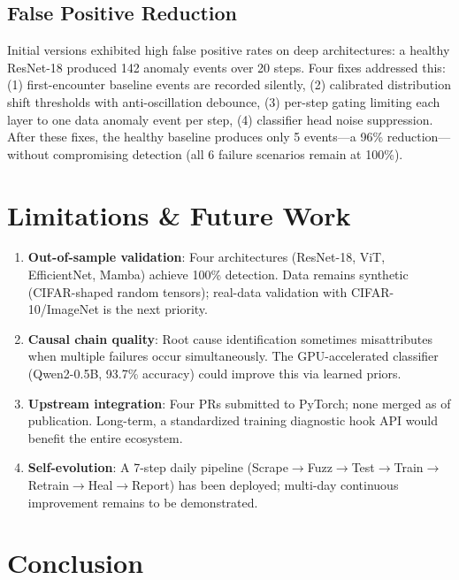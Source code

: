 \documentclass[11pt]{article}
\begin{document}
\subsection{False Positive Reduction}

Initial versions exhibited high false positive rates on deep architectures: a healthy ResNet-18 produced 142 anomaly events over 20 steps. Four fixes addressed this: (1) first-encounter baseline events are recorded silently, (2) calibrated distribution shift thresholds with anti-oscillation debounce, (3) per-step gating limiting each layer to one data anomaly event per step, (4) classifier head noise suppression. After these fixes, the healthy baseline produces only 5 events—a 96\% reduction—without compromising detection (all 6 failure scenarios remain at 100\%).

\section{Limitations \& Future Work}

\begin{enumerate}
    \item \textbf{Out-of-sample validation}: Four architectures (ResNet-18, ViT, EfficientNet, Mamba) achieve 100\% detection. Data remains synthetic (CIFAR-shaped random tensors); real-data validation with CIFAR-10/ImageNet is the next priority.
    \item \textbf{Causal chain quality}: Root cause identification sometimes misattributes when multiple failures occur simultaneously. The GPU-accelerated classifier (Qwen2-0.5B, 93.7\% accuracy) could improve this via learned priors.
    \item \textbf{Upstream integration}: Four PRs submitted to PyTorch; none merged as of publication. Long-term, a standardized training diagnostic hook API would benefit the entire ecosystem.
    \item \textbf{Self-evolution}: A 7-step daily pipeline (Scrape$\rightarrow$Fuzz$\rightarrow$Test$\rightarrow$Train$\rightarrow$Retrain$\rightarrow$Heal$\rightarrow$Report) has been deployed; multi-day continuous improvement remains to be demonstrated.
\end{enumerate}

\section{Conclusion}
\end{document}

